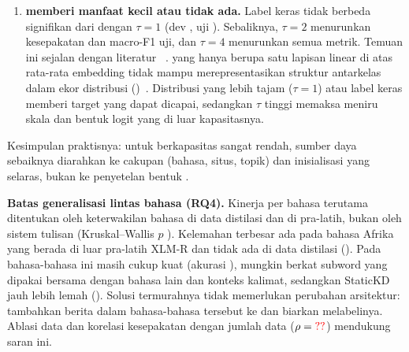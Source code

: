 \begin{enumerate}
  Ablasi embedding beku memperlihatkan sisi lain dari mekanisme yang sama.  menggeser embedding token dari bahasa yang ada di data distilasi. Akibatnya kecocokan in-distribusi naik (dev  bila dibekukan), tetapi token bahasa lain tertinggal di ruang potion yang asli, sehingga kepala linear yang sudah menyesuaikan diri dengan ruang baru kurang cocok untuk token-token itu. Di bahasa tanpa atau dengan sedikit data distilasi, embedding beku lebih baik sebesar  dan . Ini adalah bentuk pergeseran representasi () akibat  pada sebagian kosakata. Resep final tetap memakai  karena resep dipilih pada set  yang berbahasa latih. Namun untuk penggunaan yang menargetkan bahasa tanpa data distilasi, varian beku atau regularisasi yang menahan embedding dekat ke potion adalah pilihan yang lebih aman. Keduanya tetap dapat dilipat menjadi tabel.
  \item \textbf{ memberi manfaat kecil atau tidak ada.} Label keras  tidak berbeda signifikan dari  dengan $\tau=1$ (dev , uji ). Sebaliknya, $\tau=2$ menurunkan kesepakatan  dan macro-F1 uji, dan $\tau=4$ menurunkan semua metrik. Temuan ini sejalan dengan literatur ~\cite{zhang2025law,wang2026rckd}.  yang hanya berupa satu lapisan linear di atas rata-rata embedding tidak mampu merepresentasikan struktur antarkelas dalam ekor distribusi  ()~\cite{zhao2022dkd}. Distribusi yang lebih tajam ($\tau=1$) atau label keras memberi target yang dapat dicapai, sedangkan $\tau$ tinggi memaksa  meniru skala dan bentuk logit yang di luar kapasitasnya.
\end{enumerate}
Kesimpulan praktisnya: untuk  berkapasitas sangat rendah, sumber daya sebaiknya diarahkan ke cakupan  (bahasa, situs, topik) dan inisialisasi yang selaras, bukan ke penyetelan bentuk .

\textbf{Batas generalisasi lintas bahasa (RQ4).} Kinerja per bahasa terutama ditentukan oleh keterwakilan bahasa di data distilasi dan di pra-latih, bukan oleh sistem tulisan (Kruskal--Wallis $p$ ). Kelemahan terbesar ada pada bahasa Afrika yang berada di luar pra-latih XLM-R dan tidak ada di data distilasi (). Pada bahasa-bahasa ini  masih cukup kuat (akurasi ), mungkin berkat subword yang dipakai bersama dengan bahasa lain dan konteks kalimat, sedangkan StaticKD jauh lebih lemah (). Solusi termurahnya tidak memerlukan perubahan arsitektur: tambahkan berita dalam bahasa-bahasa tersebut ke  dan biarkan  melabelinya. Ablasi data dan korelasi kesepakatan dengan jumlah data ($\rho=\val{fac.data.rho}$) mendukung saran ini.

